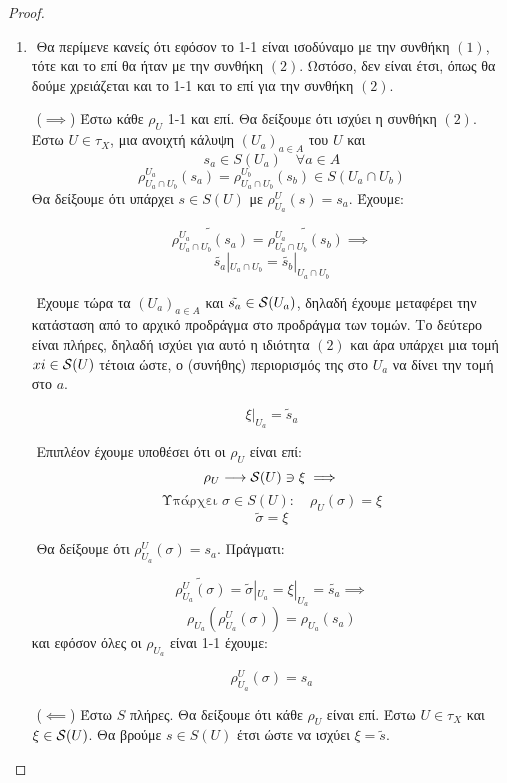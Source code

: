 \begin{proof}
\begin{enumerate}
        \item
        $ $\newline
        Θα περίμενε κανείς ότι εφόσον το 1-1 είναι ισοδύναμο με την συνθήκη $(1)$, τότε και το επί θα ήταν με την συνθήκη $(2)$. Ωστόσο, δεν είναι έτσι, όπως θα δούμε χρειάζεται και το 1-1 και το επί για την συνθήκη $(2)$.

        $ $\newline
        ($\implies$) Έστω κάθε $\rho_U$ 1-1 και επί. Θα δείξουμε ότι ισχύει η συνθήκη $(2)$. Έστω $U \in \tau_X$, μια ανοιχτή κάλυψη $(U_a)_{a \in A}$ του $U$ και
        $$s_a \in S(U_a) \quad \forall a \in A$$
        $$\rho^{U_a}_{U_a\cap U_b} (s_a) = \rho^{U_b}_{U_a \cap U_b} (s_b) \in S(U_a \cap U_b)$$ Θα δείξουμε ότι υπάρχει $s \in S(U)$ με $\rho^U_{U_a}(s) = s_a$. Έχουμε:

        $$\widetilde{\rho^{U_a}_{U_a \cap U_b} (s_a)} = \widetilde{\rho^{U_a}_{U_a \cap U_b} (s_b)} \implies $$
        $$\tilde{s_a}|_{U_a\cap U_b} = \tilde{s_b} |_{U_a \cap U_b}$$

        $ $\newline
        Έχουμε τώρα τα $(U_a)_{a\in A}$ και $\tilde{s_a} \in \mathcal{S} (U_a)$, δηλαδή έχουμε μεταφέρει την κατάσταση από το αρχικό προδράγμα στο προδράγμα των τομών. Το δεύτερο είναι πλήρες, δηλαδή ισχύει για αυτό η ιδιότητα $(2)$ και άρα υπάρχει μια τομή $xi \in \mathcal{S} (U)$ τέτοια ώστε, ο (συνήθης) περιορισμός της στο $U_a$ να δίνει την τομή στο $a$.

        $$\xi |_{U_a} = \tilde{s}_a$$

        $ $\newline
        Επιπλέον έχουμε υποθέσει ότι οι $\rho_U$ είναι επί:
        $$ \rho_U \longrightarrow \mathcal{S} (U) \ni \xi  \implies $$
        $$ \text{Υπάρχει } \sigma \in S(U): \quad \rho_U (\sigma) = \xi $$
        $$\tilde{\sigma} = \xi$$

        $ $\newline
        Θα δείξουμε ότι $\rho^U_{U_a}(\sigma) = s_a$. Πράγματι:

        $$\widetilde{\rho^U_{U_a}(\sigma)} = \tilde{\sigma}|_{U_a} = \xi|_{U_a} = \tilde{s_a} \implies $$
        $$ \rho_{U_a} \left( \rho^U_{U_a} ( \sigma)\right) = \rho_{U_a} (s_a)$$ και εφόσον όλες οι $\rho_{U_a}$ είναι 1-1 έχουμε:

        $$\rho^U_{U_a}(\sigma) = s_a$$

        $ $\newline
        ($\impliedby$) Έστω $S$ πλήρες. Θα δείξουμε ότι κάθε $\rho_U$ είναι επί. Έστω $U \in \tau_X$ και $\xi \in \mathcal{S} (U)$. Θα βρούμε $s \in S(U)$ έτσι ώστε να ισχύει $\xi = \tilde{s}$.


\end{enumerate}
\end{proof}
